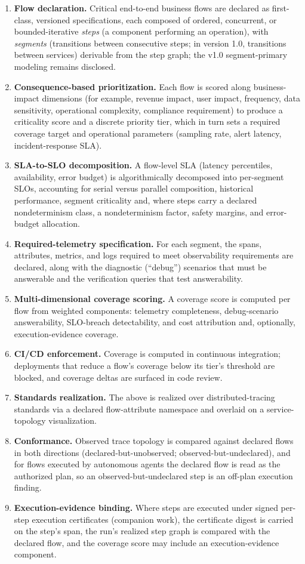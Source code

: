 \documentclass[11pt]{article}
\begin{document}
\begin{enumerate}[label=\arabic*.]
\item \textbf{Flow declaration.} Critical end-to-end business flows are declared as first-class, versioned specifications, each composed of ordered, concurrent, or bounded-iterative \emph{steps} (a component performing an operation), with \emph{segments} (transitions between consecutive steps; in version 1.0, transitions between services) derivable from the step graph; the v1.0 segment-primary modeling remains disclosed.
\item \textbf{Consequence-based prioritization.} Each flow is scored along business-impact dimensions (for example, revenue impact, user impact, frequency, data sensitivity, operational complexity, compliance requirement) to produce a criticality score and a discrete priority tier, which in turn sets a required coverage target and operational parameters (sampling rate, alert latency, incident-response SLA).
\item \textbf{SLA-to-SLO decomposition.} A flow-level SLA (latency percentiles, availability, error budget) is algorithmically decomposed into per-segment SLOs, accounting for serial versus parallel composition, historical performance, segment criticality and, where steps carry a declared nondeterminism class, a nondeterminism factor, safety margins, and error-budget allocation.
\item \textbf{Required-telemetry specification.} For each segment, the spans, attributes, metrics, and logs required to meet observability requirements are declared, along with the diagnostic (``debug'') scenarios that must be answerable and the verification queries that test answerability.
\item \textbf{Multi-dimensional coverage scoring.} A coverage score is computed per flow from weighted components: telemetry completeness, debug-scenario answerability, SLO-breach detectability, and cost attribution and, optionally, execution-evidence coverage.
\item \textbf{CI/CD enforcement.} Coverage is computed in continuous integration; deployments that reduce a flow's coverage below its tier's threshold are blocked, and coverage deltas are surfaced in code review.
\item \textbf{Standards realization.} The above is realized over distributed-tracing standards via a declared flow-attribute namespace and overlaid on a service-topology visualization.
\item \textbf{Conformance.} Observed trace topology is compared against declared flows in both directions (declared-but-unobserved; observed-but-undeclared), and for flows executed by autonomous agents the declared flow is read as the authorized plan, so an observed-but-undeclared step is an off-plan execution finding.
\item \textbf{Execution-evidence binding.} Where steps are executed under signed per-step execution certificates (companion work), the certificate digest is carried on the step's span, the run's realized step graph is compared with the declared flow, and the coverage score may include an execution-evidence component.
\end{enumerate}
\end{document}
